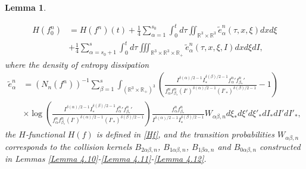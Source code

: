 \documentclass[10pt,a4paper]{amsart}
\newtheorem{lemma}{Lemma}
\def\R{\mathbb{R}}
\begin{document}
\begin{lemma}
\begin{enumerate}
{		\begin{equation}\label{entro}
			\begin{aligned}
				H(f^n_{0}) & = H(f^n)(t)+ \tfrac{1}{4}\sum \limits_{\alpha =1}^{s_0} \int_{0}^{t} d \tau \iint_{ \R^3 \times \R^3 } \tilde{e}_\alpha^n(
\tau,x,\xi ) dxd\xi\\
				& +\tfrac{1}{4}\sum \limits_{\alpha =s_0+1}^{s}\int_{0}^{t} d \tau \iiint_{ \R^3 \times \R^3 \times \R_+} \tilde{e}_\alpha^n(\tau,x,\xi ,I) dxd\xi dI ,
			\end{aligned}
		\end{equation}
where the density of entropy dissipation
\begin{equation}\label{e na}
	\begin{aligned}
	\tilde{e}_\alpha^n &= (N_n (f^n))^{-1} \sum \limits_{\beta =1}^s \int_{(\R^3\times \R_+)^3} (\tfrac{I^{\delta(\alpha)/2-1} I_* ^{\delta(\beta)/2-1}{f_\alpha^n}' {f_{\beta_*}^n}'  } {f^n_\alpha f^n_{\beta_* } (I')^{\delta(\alpha)/2-1} (I'_* )^{\delta(\beta)/2-1}} - 1)\\
&\times \log (\tfrac{I^{\delta(\alpha)/2-1} I_* ^{\delta(\beta)/2-1} {f_\alpha^n}' {f_{\beta_*}^n}' }{f^n_\alpha f^n_{\beta_* } (I')^{\delta(\alpha)/2-1} (I'_* )^{\delta(\beta)/2-1} } ) \tfrac{f^n_\alpha f^n_{\beta_* } }{I^{\delta(\alpha)/2-1} I_* ^{\delta(\beta)/2-1} }W_{\alpha\beta,n }d\xi_* d\xi'd\xi'_* dI_* dI' dI'_*,
	\end{aligned}
\end{equation}
the $H$-functional $H(f)$ is defined in \eqref{Hf}, and the transition probabilities $W_{\alpha \beta ,n}$ corresponds to the collision kernels $B_{2 \alpha \beta ,n}$, $B_{1 \alpha \beta, n}$, $B_{1 \beta \alpha, n}$ and $B_{0 \alpha \beta, n}$ constructed in Lemmas \ref{Lemma 4.10}-\ref{Lemma 4.11}-\ref{Lemma 4.12}. }\label{2 of Lemma 4.17}


\end{enumerate}
\end{lemma}
\end{document}
